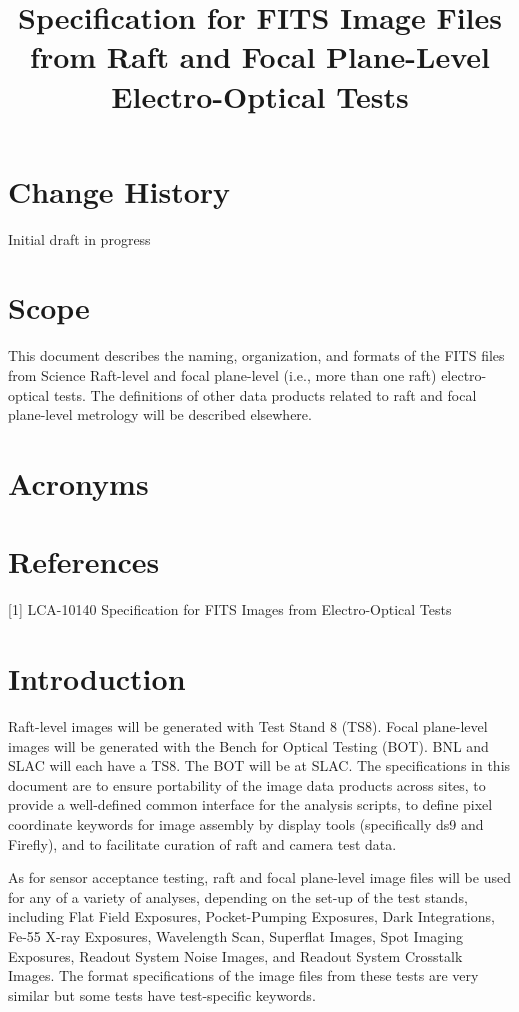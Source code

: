 \documentclass{article}[12pt]
\title{Specification for FITS Image Files from Raft and Focal Plane-Level Electro-Optical Tests}
\begin{document}
\maketitle
\tableofcontents

\section{Change History}
Initial draft in progress

\section{Scope}
This document describes the naming, organization, and formats of the FITS files from Science Raft-level and focal plane-level (i.e., more than one raft) electro-optical tests.  The definitions of other data products related to raft and focal plane-level metrology will be described elsewhere.

\section{Acronyms}

\section{References}

[1] LCA-10140 Specification for FITS Images from Electro-Optical Tests

\section{Introduction}
Raft-level images will be generated with Test Stand 8 (TS8).  Focal plane-level images will be generated with the Bench for Optical Testing (BOT).  BNL and SLAC will each have a TS8.  The BOT will be at SLAC.  The specifications in this document are to ensure portability of the image data products across sites, to provide a well-defined common interface for the analysis scripts, to define pixel coordinate keywords for image assembly by display tools (specifically ds9 and Firefly), and to facilitate curation of raft and camera test data.

As for sensor acceptance testing, raft and focal plane-level image files will be used for any of a variety of analyses, depending on the set-up of the test stands, including Flat Field Exposures, Pocket-Pumping Exposures, Dark Integrations, Fe-55 X-ray Exposures, Wavelength Scan, Superflat Images, Spot Imaging Exposures, Readout System Noise Images, and Readout System Crosstalk Images.
The format specifications of the image files from these tests are very similar but some tests have test-specific keywords.  
\end{document}
